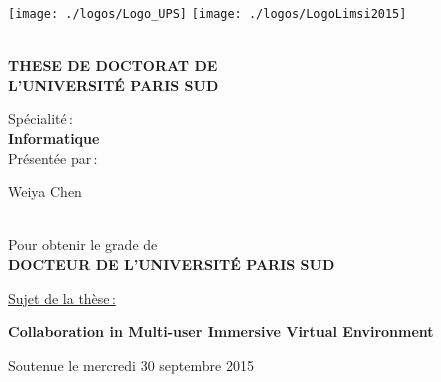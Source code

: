 \begin{titlepage}

\texttt{[image: ./logos/Logo\_UPS]}\hfill
\texttt{[image: ./logos/LogoLimsi2015]}\hfill
\\
\\

\begin{center}
  \begin{Large}
    \textbf{THESE DE DOCTORAT DE\\ L'UNIVERSIT\'E PARIS SUD\\}
  \end{Large}
  Sp\'ecialit\'e\,:\\
  \textbf{Informatique}\\ 
  Pr\'esent\'ee par\,:\\ 
  \begin{LARGE}
    Weiya Chen\end{LARGE}\\
  Pour obtenir le grade de\\
  \textbf{DOCTEUR DE L'UNIVERSIT\'E PARIS SUD}
\end{center}

\noindent \underline{Sujet de la thèse\,:}\\
\begin{center}
  \begin{Large}
    {\textbf{Collaboration in Multi-user Immersive Virtual Environment}}
  \end{Large}
\end{center}

Soutenue le mercredi 30 septembre 2015\\


\end{titlepage}
